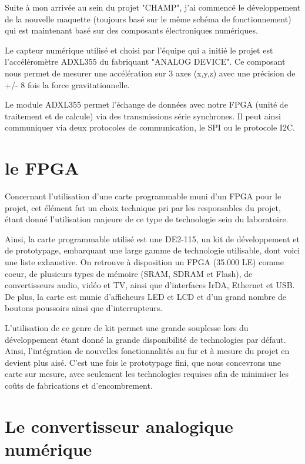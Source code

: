 \documentclass[french,a4paper,12pt]{report}
\begin{document}
 
Suite à mon arrivée au sein du projet "CHAMP", j'ai commencé le développement de la nouvelle maquette (toujours basé sur le même schéma de fonctionnement) qui est maintenant basé sur des composants électroniques numériques.
 
Le capteur numérique utilisé et choisi par l'équipe qui a initié le projet est l'accéléromètre ADXL355 du fabriquant "ANALOG DEVICE". Ce composant nous permet de mesurer une accélération sur 3 axes (x,y,z) avec une précision de +/- 8 fois la force gravitationnelle.
 
Le module ADXL355 permet l'échange de données avec notre FPGA (unité de traitement et de calcule) via des transmissions série synchrones. Il peut ainsi communiquer via deux protocoles de communication, le SPI ou le protocole I2C.
			
			\section{le FPGA}
			
			Concernant l'utilisation d'une carte programmable muni d'un FPGA pour le projet, cet élément fut un choix technique pri par les responsables du projet, étant donné l'utilisation majeure de ce type de technologie sein du laboratoire.
			
			Ainsi, la carte programmable utilisé est une DE2-115, un kit de développement et de prototypage, embarquant une large gamme de technologie utilisable, dont voici une liste exhaustive. On retrouve à disposition un FPGA (35.000 LE) comme coeur, de plusieurs types de mémoire (SRAM, SDRAM et Flash), de convertisseurs audio, vidéo et TV, ainsi que d'interfaces IrDA, Ethernet et USB. De plus, la carte est munie d'afficheurs LED et LCD et d'un grand nombre de boutons poussoirs ainsi que d'interrupteurs.
			
			L'utilisation de ce genre de kit permet une grande souplesse lors du développement étant donné la grande disponibilité de technologies par défaut. Ainsi, l'intégration de nouvelles fonctionnalités au fur et à mesure du projet en devient plus aisé. C'est une fois le prototypage fini, que nous concevrons une carte sur mesure, avec seulement les technologies requises afin de minimiser les coûts de fabrications et d'encombrement.
			
			\section{Le convertisseur analogique numérique}
			
\end{document}
